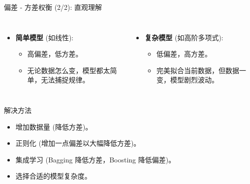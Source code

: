 \documentclass[12pt, aspectratio=169]{beamer}
\begin{document}
\begin{frame}{偏差 - 方差权衡 (2/2): 直观理解}
    \begin{columns}
        \begin{itemize}
            \item \textbf{简单模型} (如线性):
            \begin{itemize}
                \item 高偏差，低方差。
                \item 无论数据怎么变，模型都太简单，无法捕捉规律。
            \end{itemize}
        \end{itemize}
        
        \begin{itemize}
            \item \textbf{复杂模型} (如高阶多项式):
            \begin{itemize}
                \item 低偏差，高方差。
                \item 完美拟合当前数据，但数据一变，模型剧烈波动。
            \end{itemize}
        \end{itemize}
    \end{columns}
    
    \vspace{0.5cm}
    \begin{alertblock}{解决方法}
        \begin{itemize}
            \item 增加数据量 (降低方差)。
            \item 正则化 (增加一点偏差以大幅降低方差)。
            \item 集成学习 (Bagging 降低方差，Boosting 降低偏差)。
            \item 选择合适的模型复杂度。
        \end{itemize}
    \end{alertblock}
\end{frame}
\end{document}

